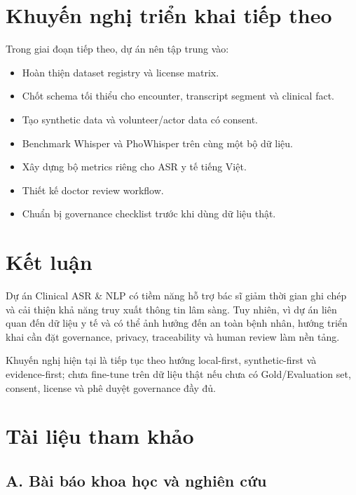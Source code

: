 \documentclass[12pt,a4paper]{article}
\begin{document}
\section{Khuyến nghị triển khai tiếp theo}

Trong giai đoạn tiếp theo, dự án nên tập trung vào:

\begin{itemize}
    \item Hoàn thiện dataset registry và license matrix.
    \item Chốt schema tối thiểu cho encounter, transcript segment và clinical fact.
    \item Tạo synthetic data và volunteer/actor data có consent.
    \item Benchmark Whisper và PhoWhisper trên cùng một bộ dữ liệu.
    \item Xây dựng bộ metrics riêng cho ASR y tế tiếng Việt.
    \item Thiết kế doctor review workflow.
    \item Chuẩn bị governance checklist trước khi dùng dữ liệu thật.
\end{itemize}

\section{Kết luận}

Dự án Clinical ASR \& NLP có tiềm năng hỗ trợ bác sĩ giảm thời gian ghi chép và cải thiện khả năng truy xuất thông tin lâm sàng. 
Tuy nhiên, vì dự án liên quan đến dữ liệu y tế và có thể ảnh hưởng đến an toàn bệnh nhân, hướng triển khai cần đặt governance, privacy, traceability và human review làm nền tảng.

Khuyến nghị hiện tại là tiếp tục theo hướng local-first, synthetic-first và evidence-first; chưa fine-tune trên dữ liệu thật nếu chưa có Gold/Evaluation set, consent, license và phê duyệt governance đầy đủ.

\section{Tài liệu tham khảo}

\subsection*{A. Bài báo khoa học và nghiên cứu}
\end{document}
